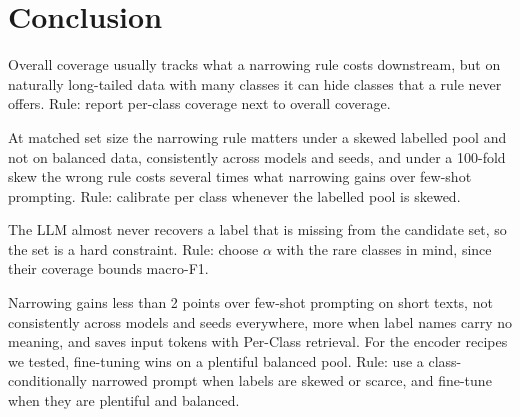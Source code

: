 \section{Conclusion}
\label{sec:conclusion}

Overall coverage usually tracks what a narrowing rule costs downstream, but on naturally long-tailed data with many classes it can hide classes that a rule never offers. Rule: report per-class coverage next to overall coverage.

At matched set size the narrowing rule matters under a skewed labelled pool and not on balanced data, consistently across models and seeds, and under a 100-fold skew the wrong rule costs several times what narrowing gains over few-shot prompting. Rule: calibrate per class whenever the labelled pool is skewed.

The LLM almost never recovers a label that is missing from the candidate set, so the set is a hard constraint. Rule: choose $\alpha$ with the rare classes in mind, since their coverage bounds macro-F1.

Narrowing gains less than 2 points over few-shot prompting on short texts, not consistently across models and seeds everywhere, more when label names carry no meaning, and saves input tokens with Per-Class retrieval. For the encoder recipes we tested, fine-tuning wins on a plentiful balanced pool. Rule: use a class-conditionally narrowed prompt when labels are skewed or scarce, and fine-tune when they are plentiful and balanced.
